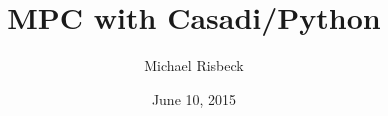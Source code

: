 \documentclass[xcolor=dvipsnames]{beamer}
\title{MPC with Casadi/Python}
\date{June 10, 2015}
\author{Michael Risbeck}
\begin{document}
\frame{\titlepage}

%    
%    
%    
%    
%
%    
%    
%    
%    
\end{document}
